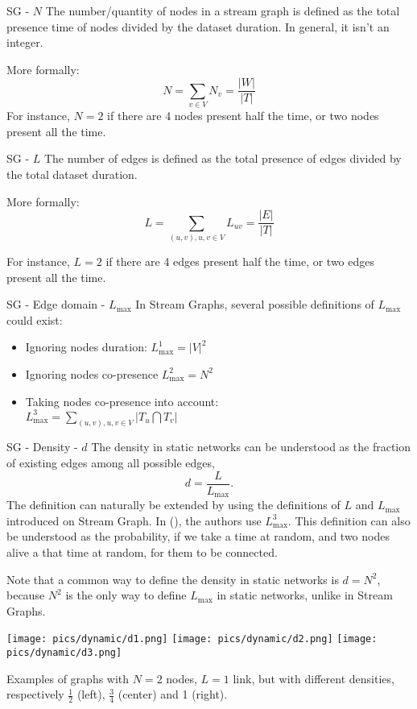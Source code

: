 \begin{textbox}{SG - $N$}
    The number/quantity of nodes in a stream graph is defined as the total presence time of nodes divided by the dataset duration. In general, it isn't an integer.

    More formally:
    \[
        N=\sum_{v\in V} N_v = \frac{|W|}{|T|}
    \]
    For instance, $N=2$ if there are 4 nodes present half the time, or two nodes present all the time.
\end{textbox}


\begin{textbox}{SG - $L$}
    The number of edges is defined as the total presence of edges divided by the total dataset duration.

    More formally:
    \[
        L=\sum_{(u,v),u,v \in V} L_{uv}=\frac{|E|}{|T|}
    \]

    For instance, $L=2$ if there are 4 edges present half the time, or two edges present all the time.
\end{textbox}


\begin{textbox}{SG - Edge domain - $L_{\max}$}
    In Stream Graphs, several possible definitions of ${L_{\max}}$ could exist:
    \begin{itemize}
        \item Ignoring nodes duration: ${L_{\max}^1}=|V|^2$
        \item Ignoring nodes co-presence ${L_{\max}^2}=N^2$
        \item Taking nodes co-presence into account:  \\ ${L_{\max}^3}=\sum_{(u,v),u,v \in V}|T_u \bigcap T_v|$
    \end{itemize}
\end{textbox}


\begin{textbox}{SG - Density - $d$}
    The density in static networks can be understood as the fraction of existing edges among all possible edges,
    \[
        d=\frac{L}{L_{\max}}.
    \]
    The definition can naturally be extended by using the definitions of $L$ and $L_{\max}$ introduced on Stream Graph. In (\cite{latapy2018stream}), the authors use ${L_{\max}^3}$. This definition can also be understood as the probability, if we take a time at random, and two nodes alive a that time at random, for them to be connected.

    Note that a common way to define the density in static networks is $d=N^2$, because $N^2$ is the only way to define $L_{\max}$ in static networks, unlike in Stream Graphs.

    \centering
    \vspace{0.3cm}

    \texttt{[image: pics/dynamic/d1.png]}
    \texttt{[image: pics/dynamic/d2.png]}
    \texttt{[image: pics/dynamic/d3.png]}

    Examples of graphs with $N=2$ nodes, $L=1$ link, but with different densities, respectively $\frac{1}{2}$ (left), $\frac{3}{4}$ (center) and 1 (right).
\end{textbox}


